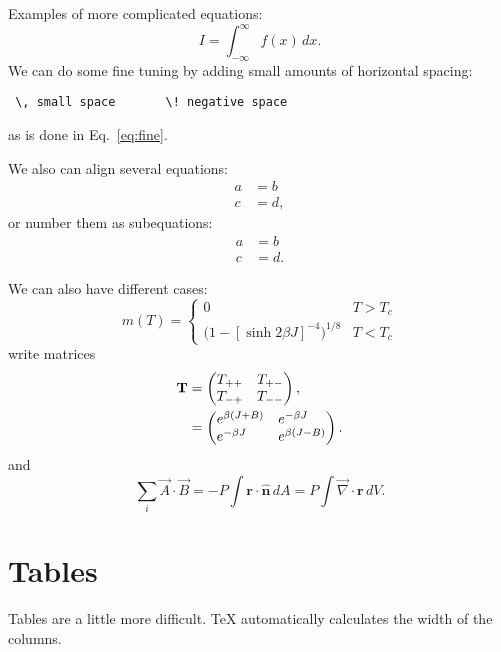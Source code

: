 \documentclass[12pt]{article}
\begin{document}
Examples of more complicated equations:
\begin{equation}
  I = \! \int_{-\infty}^\infty f(x)\,dx \label{eq:fine}.
\end{equation}
We can do some fine tuning by adding small amounts of horizontal
spacing:
\begin{verbatim}
 \, small space       \! negative space
\end{verbatim}
as is done in Eq.~\eqref{eq:fine}.

We also can align several equations:
\begin{align}
  a & = b \\
  c &= d ,
\end{align}
or number them as subequations:
\begin{subequations}
  \begin{align}
    a & = b \\
    c &= d .
  \end{align}
\end{subequations}

We can also have different cases:
\begin{equation}
  \label{eq:mdiv}
  m(T) =
  \begin{cases}
  0 & \text{$T > T_c$} \\
\bigl(1 - [\sinh 2 \beta J]^{-4} \bigr)^{\! 1/8} & \text{$T < T_c$}
\end{cases}
\end{equation}
write matrices
\begin{align}
  \textbf{T} &=
  \begin{pmatrix}
    T_{++} \hfill & T_{+-} \\
    T_{-+} & T_{--} \hfill 
  \end{pmatrix} , \nonumber \\
  & =
  \begin{pmatrix}
    e^{\beta (J + B)} \hfill & e^{-\beta J} \hfill \\
    e^{-\beta J} \hfill & e^{\beta (J - B)} \hfill
  \end{pmatrix}.
\end{align}
and 
\newcommand{\rv}{\textbf{r}}
\begin{equation}
  \sum_i \vec A \cdot \vec B = -P\!\int\! \rv \cdot
  \hat{\mathbf{n}}\, dA = P\!\int \! {\vec \nabla} \cdot \rv\, dV.
\end{equation}

\section{Tables}
Tables are a little more difficult. TeX
automatically calculates the width of the columns.
\end{document}
